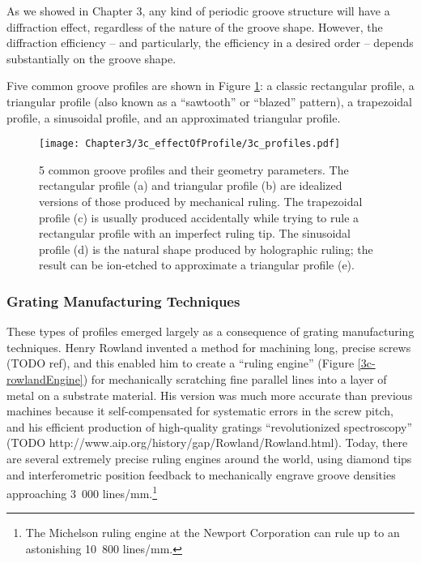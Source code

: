 As we showed in Chapter 3, any kind of periodic groove structure will have a diffraction effect, regardless of the nature of the groove shape.  However, the diffraction efficiency -- and particularly, the efficiency in a desired order -- depends substantially on the groove shape.  

Five common groove profiles are shown in Figure \ref{3c-profile}: a classic rectangular profile, a triangular profile (also known as a ``sawtooth'' or ``blazed'' pattern), a trapezoidal profile, a sinusoidal profile, and an approximated triangular profile.

\begin{figure}[htbp] %
   \centering
   \texttt{[image: Chapter3/3c\_effectOfProfile/3c\_profiles.pdf]}
   \caption{5 common groove profiles and their geometry parameters.  The rectangular profile (a) and triangular profile (b) are idealized versions of those produced by mechanical ruling.  The trapezoidal profile (c) is usually produced accidentally while trying to rule a rectangular profile with an imperfect ruling tip.  The sinusoidal profile (d) is the natural shape produced by holographic ruling; the result can be ion-etched to approximate a triangular profile (e).}
   \label{3c-profile}
\end{figure}

\subsubsection{Grating Manufacturing Techniques}
These types of profiles emerged largely as a consequence of grating manufacturing techniques.  Henry Rowland invented a method for machining long, precise screws (TODO ref), and this enabled him to create a ``ruling engine'' (Figure \ref{3c-rowlandEngine}) for mechanically scratching fine parallel lines into a layer of metal on a substrate material.  His version was much more accurate than previous machines because it self-compensated for systematic errors in the screw pitch, and his efficient production of high-quality gratings ``revolutionized spectroscopy'' (TODO http://www.aip.org/history/gap/Rowland/Rowland.html).  Today, there are several extremely precise ruling engines around the world, using diamond tips and interferometric position feedback to mechanically engrave groove densities approaching 3~000 lines/mm.\footnote{The Michelson ruling engine at the Newport Corporation can rule up to an astonishing 10~800 lines/mm.}

